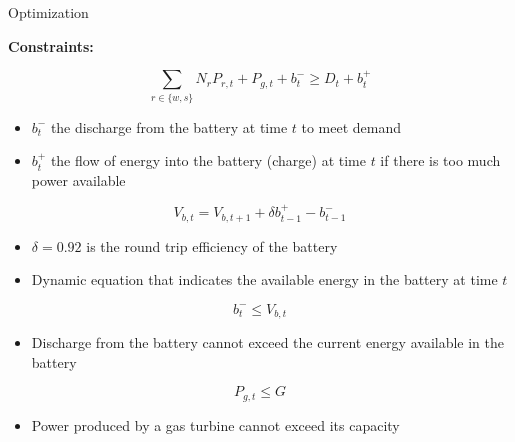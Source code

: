 \documentclass[final]{beamer}
\newlength{\onecolwid}
\newlength{\twocolwid}
\begin{document}
\begin{frame}[t]
\begin{columns}[t]
\begin{column}{\twocolwid}
\begin{columns}[t,totalwidth=\twocolwid]
\begin{column}{\onecolwid}
\begin{block}{Optimization}
\begin{itemize}
\end{itemize}


\textbf{Constraints:}

\begin{equation}
\displaystyle \sum_{r \in \{w,s\}}  N_r P_{r,t} + P_{g,t} + b_t^{-} \ge D_t + b_t^{+} 
\label{eq:demand}
\end{equation}

\begin{itemize}
	\item $b_t^{-}$   the discharge from the battery at time $t$ to meet demand 
	\item  $b_t^{+}$  the flow of energy into the battery (charge) at time $t$ if there is too much power available
\end{itemize}



\begin{equation}
V_{b,t}  =  V_{b,t+1} + \delta b_{t-1}^{+} - b_{t-1}^{-} 
\label{eq:battery}
\end{equation}


\begin{itemize}
	\item $\delta = 0.92$ is the round trip efficiency of the battery
	\item Dynamic equation that indicates the available energy in the battery at time $t$ 
\end{itemize}


\begin{equation}
b_t^{-} \le  V_{b,t} 
\label{eq:discharge}
\end{equation}

\begin{itemize}
	\item Discharge from the battery cannot exceed the current energy available in the battery
\end{itemize}


\begin{equation}
P_{g,t} \le  G 
\label{eq:gas}
\end{equation}

\begin{itemize}
	\item Power produced by a gas turbine cannot exceed its capacity 
\end{itemize}

\end{block}






\end{column}
\end{columns}
\end{column}
\end{columns}
\end{frame}
\end{document}
